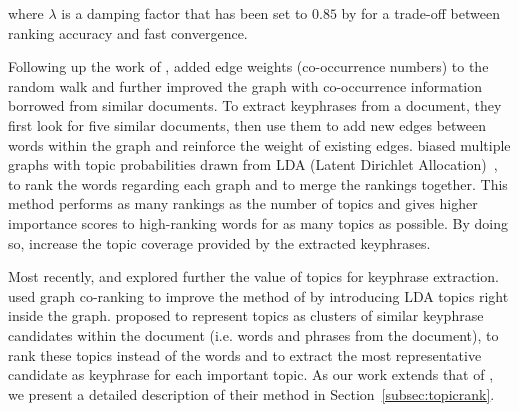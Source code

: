         \noindent where $\lambda$ is a damping factor that has been set to $0.85$ by  for a trade-off between ranking accuracy and fast convergence.
    
        Following up the work of ,  added edge weights (co-occurrence numbers) to the random walk and further improved the graph with co-occurrence information borrowed from similar documents. To extract keyphrases from a document, they first look for
    five similar documents, then use them to add new edges between words within
    the graph and reinforce the weight of existing edges.
          biased multiple graphs with topic probabilities drawn from LDA (Latent Dirichlet Allocation)~\cite{blei2003lda}, to rank the words regarding each graph and to merge the rankings together. This method
    performs as many rankings as the number of topics and gives higher importance
    scores to high-ranking words for as many topics as possible. By doing so,
    increase the topic coverage provided by the extracted keyphrases.

        Most recently,  and  explored further the value of topics for keyphrase extraction. 
         used graph co-ranking to improve the method of  by introducing LDA topics right inside the graph.
         proposed to represent topics as clusters of similar keyphrase candidates within the document (i.e. words and phrases from the document), to rank these topics instead of the words and to extract the most representative candidate as keyphrase for each important topic.
        As our work extends that of , we present a detailed description of their method in Section~\ref{subsec:topicrank}.
    
